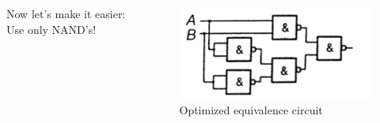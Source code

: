 \documentclass{beamer}
\begin{document}
\begin{frame}
  \begin{columns}
  \begin{column}{5cm}
  Now let's make it easier: Use only NAND's!
  \newline\newline
  \end{column}
  
  \begin{column}{6cm}
    \begin{figure}[H]
      \centering
      \includegraphics[width=1\textwidth]{equivalence_optimized}%
      \caption{Optimized equivalence circuit}%
      \label{fig:equivalence_optimized}
    \end{figure}
  \end{column}
  \end{columns}  
\end{frame}
\end{document}
